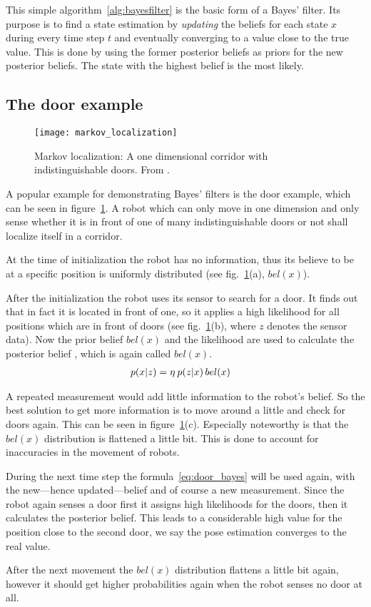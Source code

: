 \documentclass[Thesis.tex]{subfiles}
\begin{document}
This simple algorithm~\ref{alg:bayesfilter} is the basic form of a Bayes' filter. Its purpose is to find a state estimation by \emph{updating} the beliefs for each state $x$ during every time step $t$ and eventually converging to a value close to the true value. This is done by using the former posterior beliefs as priors for the new posterior beliefs.
The state with the highest belief is the most likely.

\subsection{The door example}
\begin{figure}
  \centering
  \texttt{[image: markov\_localization]}
  \caption{Markov localization: A one dimensional corridor with indistinguishable doors. From \cite[p.~6]{ThrunBurgardFox:2005}.}
  \label{fig:markov_localization_one_dimension}
\end{figure}

A popular example for demonstrating Bayes' filters is the door example, which can be seen in figure~\ref{fig:markov_localization_one_dimension}. A robot which can only move in one dimension and only sense whether it is in front of one of many indistinguishable doors or not shall localize itself in a corridor. 

At the time of initialization the robot has no information, thus its believe to be at a specific position is uniformly distributed (see fig.~\ref{fig:markov_localization_one_dimension}(a), $bel(x)$).

After the initialization the robot uses its sensor to search for a door. It finds out that in fact it is located in front of one, so it applies a high likelihood for all positions which are in front of doors (see fig.~\ref{fig:markov_localization_one_dimension}(b),  where $z$ denotes the sensor data). Now the prior belief $bel(x)$ and the likelihood  are used to calculate the posterior belief , which is again called $bel(x)$.
%
\begin{align}
p\!\left({x}\middle|{z}\right) &= \eta\: p\!\left({z}\middle|{x}\right) bel(x) \label{eq:door_bayes}
\end{align}

A repeated measurement would add little information to the robot's belief. So the best solution to get more information is to move around a little and check for doors again. This can be seen in figure~\ref{fig:markov_localization_one_dimension}(c). Especially noteworthy is that the $bel(x)$ distribution is flattened a little bit. This is done to account for inaccuracies in the movement of robots.

During the next time step the formula~\ref{eq:door_bayes} will be used again, with the new---hence updated---belief and of course a new measurement. Since the robot again senses a door first it assigns high likelihoods for the doors, then it calculates the posterior belief. This leads to a considerable high value for the position close to the second door, we say the pose estimation converges to the real value. 

After the next movement the $bel(x)$ distribution flattens a little bit again, however it should get higher probabilities again when the robot senses no door at all.
\end{document}
